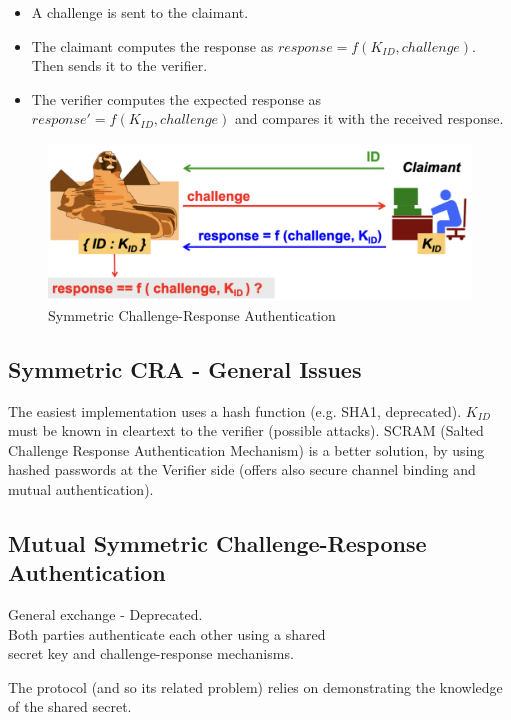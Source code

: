 \begin{multicols}{2}

    \begin{itemize}
        \item A challenge is sent to the claimant.
        \item The claimant computes the response as \(response = f(K_{ID}, challenge)\). Then sends it to the verifier.
        \item The verifier computes the expected response as \(response' = f(K_{ID}, challenge)\) and compares it with the received response.
    \end{itemize}
    
\columnbreak

    \begin{figure}[H]
        \centering
        \includegraphics[width=\linewidth]{Images/Authentication/symCRA.png}
        \caption{Symmetric Challenge-Response Authentication}
    \end{figure}
\end{multicols}

\subsection*{Symmetric CRA - General Issues}
The easiest implementation uses a hash function (e.g. SHA1, deprecated). $K_{ID}$ must be known in cleartext to the verifier (possible attacks). SCRAM (Salted Challenge Response Authentication Mechanism) is a better solution, by using hashed passwords at the Verifier side (offers also secure channel binding and mutual authentication).

\clearpage
\subsection{Mutual Symmetric Challenge-Response Authentication} 
\begin{center}
    General exchange - Deprecated.\\
    Both parties authenticate each other using a shared \\secret key and challenge-response mechanisms.\\ 
\end{center}
\begin{tcolorbox}[colback=red!10!white, colframe=red!70!black, coltitle=white, title=Beware]
The protocol (and so its related problem) relies on demonstrating the knowledge of the shared secret.
\end{tcolorbox}

